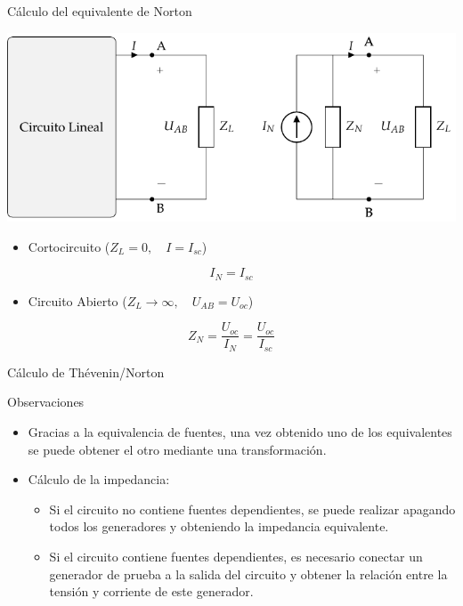 \documentclass[xcolor={usenames,svgnames,dvipsnames}]{beamer}
\begin{document}
\begin{frame}[label={sec:orgc203f2f}]{Cálculo del equivalente de Norton}
\begin{center}
\includegraphics[width=.9\linewidth]{figs/EquivalenteNorton.pdf}
\end{center}

\begin{itemize}
\item Cortocircuito (\(Z_L = 0, \quad I = I_{sc}\))
\end{itemize}
\[
\boxed{I_N = I_{sc}}
\]
\begin{itemize}
\item Circuito Abierto (\(Z_L \to \infty, \quad U_{AB} = U_{oc}\))
\end{itemize}
\[
\boxed{Z_N = \frac{U_{oc}}{I_N} = \frac{U_{oc}}{I_{sc}}}
\]
\end{frame}

\begin{frame}[label={sec:org5197594}]{Cálculo de Thévenin/Norton}
\begin{block}{Observaciones}
\begin{itemize}
\item Gracias a la equivalencia de fuentes, una vez obtenido uno de los equivalentes se puede obtener el otro mediante una transformación.
\item Cálculo de la impedancia:
\begin{itemize}
\item Si el circuito \alert{no} contiene fuentes dependientes, se puede realizar \alert{apagando} todos los \alert{generadores} y obteniendo la impedancia equivalente.
\item Si el circuito contiene fuentes dependientes, es necesario conectar un \alert{generador de prueba} a la salida del circuito y obtener la relación entre la tensión y corriente de este generador.
\end{itemize}
\end{itemize}
\end{block}
\end{frame}
\end{document}

